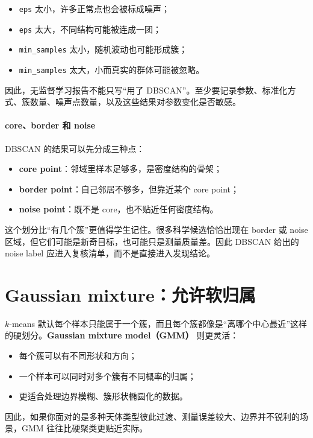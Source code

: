 \begin{itemize}
    \item \texttt{eps} 太小，许多正常点也会被标成噪声；
    \item \texttt{eps} 太大，不同结构可能被连成一团；
    \item \texttt{min\_samples} 太小，随机波动也可能形成簇；
    \item \texttt{min\_samples} 太大，小而真实的群体可能被忽略。
\end{itemize}

因此，无监督学习报告不能只写“用了 DBSCAN”。至少要记录参数、标准化方式、簇数量、噪声点数量，以及这些结果对参数变化是否敏感。

\paragraph{core、border 和 noise}

DBSCAN 的结果可以先分成三种点：

\begin{itemize}
    \item \textbf{core point}：邻域里样本足够多，是密度结构的骨架；
    \item \textbf{border point}：自己邻居不够多，但靠近某个 core point；
    \item \textbf{noise point}：既不是 core，也不贴近任何密度结构。
\end{itemize}

这个划分比“有几个簇”更值得学生记住。很多科学候选恰恰出现在 border 或 noise 区域，但它们可能是新奇目标，也可能只是测量质量差。因此 DBSCAN 给出的 noise label 应进入复核清单，而不是直接进入发现结论。

\section{Gaussian mixture：允许软归属}

$k$-means 默认每个样本只能属于一个簇，而且每个簇都像是“离哪个中心最近”这样的硬划分。\textbf{Gaussian mixture model（GMM）} 则更灵活：

\begin{itemize}
    \item 每个簇可以有不同形状和方向；
    \item 一个样本可以同时对多个簇有不同概率的归属；
    \item 更适合处理边界模糊、簇形状椭圆化的数据。
\end{itemize}

因此，如果你面对的是多种天体类型彼此过渡、测量误差较大、边界并不锐利的场景，GMM 往往比硬聚类更贴近实际。

